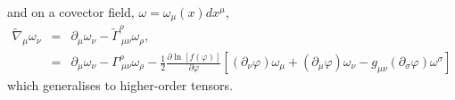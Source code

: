 and on a covector field, $\omega = \omega_{\mu} (x)dx^{\mu}$, 
\begin{eqnarray*}
    \tilde{\nabla}_{\mu}\omega_{\nu} &=& \partial_{\mu}\omega_{\nu} - \tilde{\Gamma}^{\rho}_{\ \mu\nu}\omega_{\rho},\\
    &=& \partial_{\mu}\omega_{\nu} - \Gamma^{\rho}_{\ \mu\nu}\omega_{\rho} - \frac{1}{2}\frac{\partial \ln[f(\varphi)]}{\partial \varphi}\left[(\partial_{\nu}\varphi)\omega_{\mu} + (\partial_{\mu}\varphi)\omega_{\nu} -g_{\mu\nu}(\partial_{\sigma}\varphi)\omega^{\sigma}\right]
\end{eqnarray*}
which generalises to higher-order tensors.